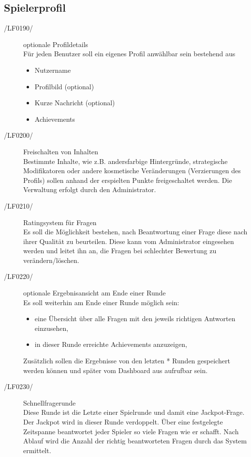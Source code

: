 \documentclass[11pt,a4paper]{scrreprt}
\begin{document}
\subsection{Spielerprofil}
\begin{description}
\item[/LF0190/] optionale Profildetails \\ 
Für jeden Benutzer soll ein eigenes Profil anwählbar sein bestehend aus
	\begin{itemize}
	\item Nutzername
	\item Profilbild (optional)
	\item Kurze Nachricht (optional)
	\item Achievements
	\end{itemize}
\item[/LF0200/] Freischalten von Inhalten \\
Bestimmte Inhalte, wie z.B. andersfarbige Hintergründe, strategische Modifikatoren oder andere kosmetische Veränderungen (Verzierungen des Profils) sollen anhand der erspielten Punkte freigeschaltet werden. Die Verwaltung erfolgt durch den Administrator.
\item[/LF0210/] Ratingsystem für Fragen \\
Es soll die Möglichkeit bestehen, nach Beantwortung einer Frage diese nach ihrer Qualität zu beurteilen. Diese kann vom Administrator eingesehen werden und leitet ihn an, die Fragen bei schlechter Bewertung zu verändern/löschen.
\item[/LF0220/] optionale Ergebnisansicht am Ende einer Runde \\
Es soll weiterhin am Ende einer Runde möglich sein:
		\begin{itemize}
		\item eine Übersicht über alle Fragen mit den jeweils richtigen Antworten einzusehen,
		\item in dieser Runde erreichte Achievements anzuzeigen,
		\end{itemize}
Zusätzlich sollen die Ergebnisse von den letzten * Runden gespeichert werden können und später vom Dashboard aus aufrufbar sein.
\item[/LF0230/] Schnellfragerunde \\
Diese Runde ist die Letzte einer Spielrunde und damit eine Jackpot-Frage. Der Jackpot wird in dieser Runde verdoppelt.
Über eine festgelegte Zeitspanne beantwortet jeder Spieler so viele Fragen wie er schafft. Nach Ablauf wird die Anzahl der richtig beantworteten Fragen durch das System ermittelt.

\end{description}
\end{document}
